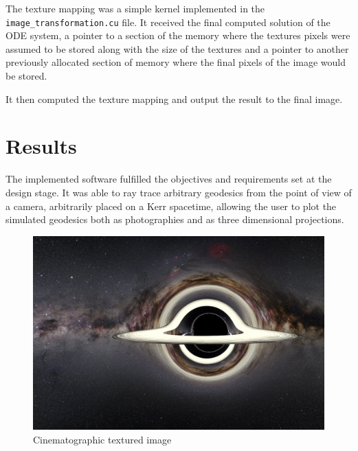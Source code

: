 The texture mapping was a simple kernel implemented in the \lstinline{image_transformation.cu} file. It received the final computed solution of the \ac{ODE} system, a pointer to a section of the memory where the textures pixels were assumed to be stored along with the size of the textures and a pointer to another previously allocated section of memory where the final pixels of the image would be stored.

It then computed the texture mapping and output the result to the final image.




















\section{Results}
\label{chapter:results}

The implemented software fulfilled the objectives and requirements set at the design stage. It was able to ray trace arbitrary geodesics from the point of view of a camera, arbitrarily placed on a Kerr spacetime, allowing the user to plot the simulated geodesics both as photographies and as three dimensional projections.

\begin{figure}[bth]
	\myfloatalign
	\includegraphics[width=\linewidth]{gfx/bh_texture_disk}
	\caption[Cinematographic textured image]{Cinematographic textured image}
	\label{fig:blackhole}
\end{figure}

